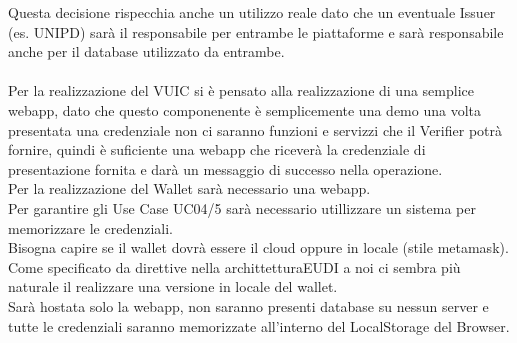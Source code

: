 Questa decisione rispecchia anche un utilizzo reale dato che un eventuale Issuer (es. UNIPD) sarà il responsabile
per entrambe le piattaforme e sarà responsabile anche per il database utilizzato da entrambe.\\
\\
Per la realizzazione del VUIC si è pensato alla realizzazione di una semplice webapp, dato che questo componenente è semplicemente una demo una volta presentata una credenziale
non ci saranno funzioni e servizzi che il Verifier potrà fornire, quindi è suficiente una webapp che riceverà la credenziale di presentazione fornita e darà un messaggio di successo nella operazione.
\\
Per la realizzazione del Wallet sarà necessario una webapp.\\
Per garantire gli Use Case UC04/5 sarà necessario utillizzare un sistema per memorizzare le credenziali.\\
Bisogna capire se il wallet dovrà essere il cloud oppure in locale (stile metamask).\\
Come specificato da direttive nella archittetturaEUDI a noi ci sembra più naturale il realizzare una versione in locale del wallet.\\
Sarà hostata solo la webapp, non saranno presenti database su nessun server e tutte le credenziali saranno memorizzate all'interno del LocalStorage del Browser.\\

